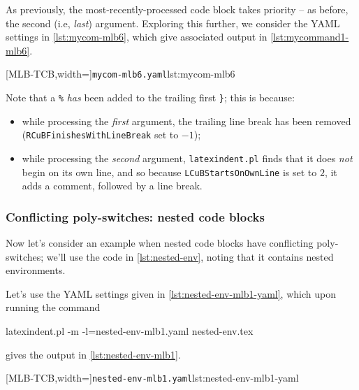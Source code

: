 	As previously, the most-recently-processed code block takes priority -- as before, the
	second (i.e, \emph{last}) argument. Exploring this further, we consider the YAML settings
	in \cref{lst:mycom-mlb6}, which give associated output in \cref{lst:mycommand1-mlb6}.

	\begin{cmhtcbraster}[raster column skip=.1\linewidth]
		[MLB-TCB,width=\linewidth]{\texttt{mycom-mlb6.yaml}}{lst:mycom-mlb6}
	\end{cmhtcbraster}

	Note that a \lstinline!%! \emph{has} been added to the trailing first
	\lstinline!}!; this is because:
	\begin{itemize}
		\item while processing the \emph{first} argument, the trailing line break has been removed
		      (\texttt{RCuBFinishesWithLineBreak} set to $-1$);
		\item while processing the \emph{second} argument, \texttt{latexindent.pl} finds that it does
		      \emph{not} begin on its own line, and so because \texttt{LCuBStartsOnOwnLine} is set to
		      $2$, it adds a comment, followed by a line break.
	\end{itemize}

\subsubsection{Conflicting poly-switches: nested code blocks}
	Now let's consider an example when nested code blocks have conflicting poly-switches;
	we'll use the code in \cref{lst:nested-env}, noting that it contains nested environments.


	Let's use the YAML settings given in \cref{lst:nested-env-mlb1-yaml}, which upon running
	the command
	\begin{commandshell}
latexindent.pl -m -l=nested-env-mlb1.yaml nested-env.tex
\end{commandshell}
	gives the output in \cref{lst:nested-env-mlb1}.

	\begin{cmhtcbraster}[raster column skip=.05\linewidth]
		[MLB-TCB,width=\linewidth]{\texttt{nested-env-mlb1.yaml}}{lst:nested-env-mlb1-yaml}
	\end{cmhtcbraster}

